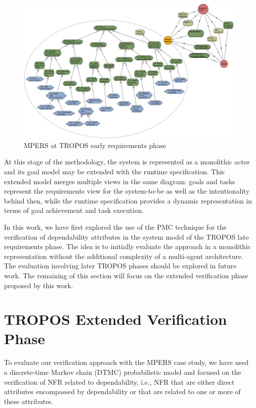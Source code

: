 \begin{figure}[h!]
\centering
\includegraphics[width=1\textwidth]{imgs/MPERS_LR.png}
\caption{MPERS at TROPOS early requirements phase}
\label{fig:MPERS_LR}
\end{figure}

At this stage of the methodology, the system is represented as a monolithic actor and its goal model may be extended with the runtime specification. This extended model merges multiple views in the same diagram: goals and tasks represent the requirements view for the system-to-be as well as the intentionality behind then, while the runtime specification provides a dynamic representation in terms of goal achievement  and task execution.

In this work, we have first explored the use of the PMC technique for the verification of dependability attributes in the system model of the TROPOS late requirements phase. The idea is to initially evaluate the approach in a monolithic representation without the additional complexity of a multi-agent architecture. The evaluation involving later TROPOS phases should be explored in future work. The remaining of this section will focus on the extended verification phase proposed by this work.

\section{TROPOS Extended Verification Phase}

To evaluate our verification approach with the MPERS case study, we have used a discrete-time Markov chain (DTMC) probabilistic model and focused on the verification of NFR related to dependability, i.e., NFR that are either direct attributes encompassed by dependability or that are related to one or more of these attributes.

